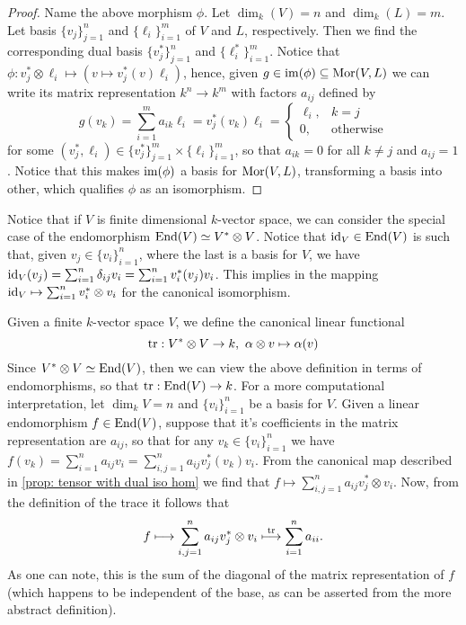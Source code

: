 \begin{proof}
    Name the above morphism \(\phi\). Let \(\dim_k(V) = n\) and \(\dim_k(L) = m\).
    Let basis \(\{v_j\}_{j=1}^n\) and \(\{\ell_i\}_{i=1}^m\) of \(V\) and \(L\),
    respectively. Then we find the corresponding dual basis \(\{v_j^*\}_{j=1}^n\)
    and \(\{\ell_i^*\}_{i=1}^m\). Notice that \(\phi :v_j^* \otimes \ell_i \mapsto
    (v \mapsto v_j^*(v) \ell_i)\), hence, given \(g \in \operatorname{im}(\phi) \subseteq
    \operatorname{Mor}(V, L)\) we can write its matrix representation \(k^n \to k^m\) with
    factors \(a_{ij}\) defined by
    \[
        g(v_k) = \sum_{i=1}^m a_{ik} \ell_i = v_j^*(v_k)\ell_i =
        \begin{cases}
            \ell_i, & k = j            \\
            0,      & \text{otherwise}
        \end{cases}
    \]
    for some \((v_j^*, \ell_i) \in \{v_j^*\}_{j=1}^m \times \{\ell_i\}_{i=1}^m\),
    so that \(a_{ik} = 0\) for all \(k \neq j\) and \(a_{ij} = 1\). Notice that
    this makes \(\operatorname{im}(\phi)\) a basis for \(\operatorname{Mor}(V, L)\), transforming a basis into
    other, which qualifies \(\phi\) as an isomorphism.
\end{proof}

Notice that if \(V\) is finite dimensional \(k\)-vector space, we can consider
the special case of the endomorphism \(\operatorname{End}(V) \simeq V^* \otimes V\). Notice
that \(\operatorname{id}_V \in \operatorname{End}(V)\) is such that, given \(v_j \in \{v_i\}_{i=1}^n\),
where the last is a basis for \(V\), we have \(\operatorname{id}_V(v_j) = \sum_{i=1}^n
\delta_{ij} v_i = \sum_{i=1}^n v_i^*(v_j) v_i\). This implies in the mapping
\(\operatorname{id}_V \mapsto \sum_{i=1}^n v_i^* \otimes v_i\) for the canonical isomorphism.

\begin{definition}[Trace]\label{def: trace}
    Given a finite \(k\)-vector space \(V\), we define the canonical linear
    functional
    \[
        \operatorname{tr}: V^* \otimes V \to k,\ \alpha \otimes v \mapsto
        \alpha(v)
    \]
    Since \(V^* \otimes V \simeq \operatorname{End}(V)\), then we can view the above definition in
    terms of endomorphisms, so that \(\operatorname{tr}: \operatorname{End}(V) \to k\). For a more
    computational interpretation, let \(\dim_k V = n\) and \(\{v_i\}_{i=1}^n\) be
    a basis for \(V\). Given a linear endomorphism \(f \in \operatorname{End}(V)\), suppose
    that it's coefficients in the matrix representation are \(a_{ij}\), so that
    for any \(v_k \in \{v_i\}_{i=1}^n\) we have \(f(v_k) = \sum_{i=1}^n a_{ij} v_i
    = \sum_{i,j=1}^n a_{ij} v_j^*(v_k) v_i\). From the canonical map described in
    \cref{prop: tensor with dual iso hom} we find that \(f \mapsto \sum_{i,j=1}^n
    a_{ij} v_j^* \otimes v_i\). Now, from the definition of the trace it follows
    that
    \[
        f \longmapsto \sum_{i,j=1}^n a_{ij} v_j^* \otimes v_i \overset{\operatorname{tr}}\longmapsto
        \sum_{i=1}^n a_{ii}.
    \]
    As one can note, this is the sum of the diagonal of the matrix representation
    of \(f\) (which happens to be independent of the base, as can be asserted from
    the more abstract definition).
\end{definition}


